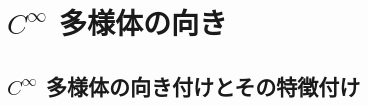 \documentclass[geometry_main]{subfiles}
\begin{document}
\section{$C^\infty$ 多様体の向き}

\subsection{$C^\infty$ 多様体の向き付けとその特徴付け}




\end{document}
